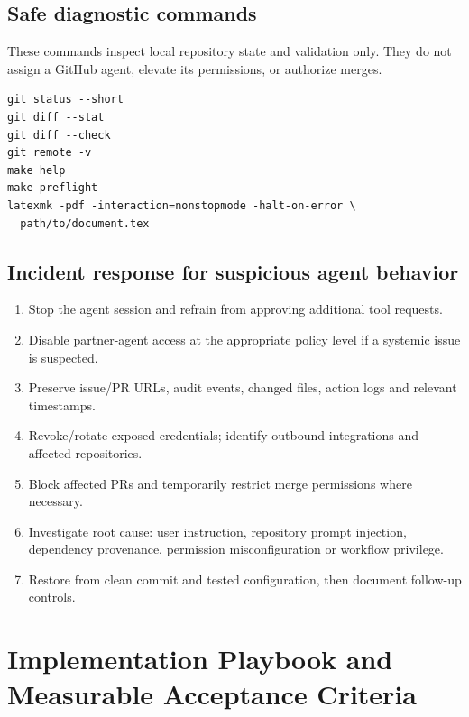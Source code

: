 \documentclass[11pt,letterpaper,oneside]{article}
\begin{document}
\subsection{Safe diagnostic commands}
These commands inspect local repository state and validation only. They do not assign a GitHub agent, elevate its permissions, or authorize merges.
\begin{lstlisting}[style=bashstyle,caption={Local read-only/validation diagnostics.}]
git status --short
git diff --stat
git diff --check
git remote -v
make help
make preflight
latexmk -pdf -interaction=nonstopmode -halt-on-error \
  path/to/document.tex
\end{lstlisting}

\subsection{Incident response for suspicious agent behavior}
\begin{enumerate}
\item Stop the agent session and refrain from approving additional tool requests.
\item Disable partner-agent access at the appropriate policy level if a systemic issue is suspected.
\item Preserve issue/PR URLs, audit events, changed files, action logs and relevant timestamps.
\item Revoke/rotate exposed credentials; identify outbound integrations and affected repositories.
\item Block affected PRs and temporarily restrict merge permissions where necessary.
\item Investigate root cause: user instruction, repository prompt injection, dependency provenance, permission misconfiguration or workflow privilege.
\item Restore from clean commit and tested configuration, then document follow-up controls.
\end{enumerate}

\section{Implementation Playbook and Measurable Acceptance Criteria}
\end{document}
